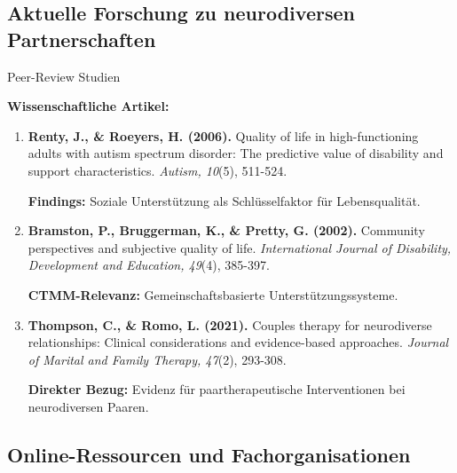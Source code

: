 \subsection{Aktuelle Forschung zu neurodiversen Partnerschaften}

\begin{ctmmOrangeBox}{Peer-Review Studien}

\textbf{Wissenschaftliche Artikel:}
\begin{enumerate}
  \item \textbf{Renty, J., \& Roeyers, H. (2006).} Quality of life in high-functioning adults with autism spectrum disorder: The predictive value of disability and support characteristics. \textit{Autism, 10}(5), 511-524.

  \textbf{Findings:} Soziale Unterstützung als Schlüsselfaktor für Lebensqualität.

  \item \textbf{Bramston, P., Bruggerman, K., \& Pretty, G. (2002).} Community perspectives and subjective quality of life. \textit{International Journal of Disability, Development and Education, 49}(4), 385-397.

  \textbf{CTMM-Relevanz:} Gemeinschaftsbasierte Unterstützungssysteme.

  \item \textbf{Thompson, C., \& Romo, L. (2021).} Couples therapy for neurodiverse relationships: Clinical considerations and evidence-based approaches. \textit{Journal of Marital and Family Therapy, 47}(2), 293-308.

  \textbf{Direkter Bezug:} Evidenz für paartherapeutische Interventionen bei neurodiversen Paaren.
\end{enumerate}

\end{ctmmOrangeBox}

\subsection{Online-Ressourcen und Fachorganisationen}

